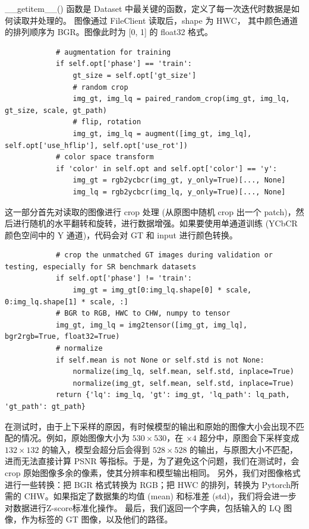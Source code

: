 \documentclass[../main.tex]{subfiles}
\begin{document}
    \_\_getitem\_\_() 函数是 Dataset 中最关键的函数，定义了每一次迭代时数据是如何读取并处理的。 图像通过 FileClient 读取后，shape 为 HWC， 其中颜色通道的排列顺序为 BGR。图像此时为 [0, 1] 的 float32 格式。
    \begin{verbatim}
            # augmentation for training
            if self.opt['phase'] == 'train':
                gt_size = self.opt['gt_size']
                # random crop
                img_gt, img_lq = paired_random_crop(img_gt, img_lq, gt_size, scale, gt_path)
                # flip, rotation
                img_gt, img_lq = augment([img_gt, img_lq], self.opt['use_hflip'], self.opt['use_rot'])
            # color space transform
            if 'color' in self.opt and self.opt['color'] == 'y':
                img_gt = rgb2ycbcr(img_gt, y_only=True)[..., None]
                img_lq = rgb2ycbcr(img_lq, y_only=True)[..., None]
    \end{verbatim}
    这一部分首先对读取的图像进行 crop 处理 (从原图中随机 crop 出一个 patch)，然后进行随机的水平翻转和旋转，进行数据增强。如果要使用单通道训练 (YCbCR 颜色空间中的 Y 通道)，代码会对 GT 和 input 进行颜色转换。
    \begin{verbatim}
            # crop the unmatched GT images during validation or testing, especially for SR benchmark datasets
            if self.opt['phase'] != 'train':
                img_gt = img_gt[0:img_lq.shape[0] * scale, 0:img_lq.shape[1] * scale, :]
            # BGR to RGB, HWC to CHW, numpy to tensor
            img_gt, img_lq = img2tensor([img_gt, img_lq], bgr2rgb=True, float32=True)
            # normalize
            if self.mean is not None or self.std is not None:
                normalize(img_lq, self.mean, self.std, inplace=True)
                normalize(img_gt, self.mean, self.std, inplace=True)
            return {'lq': img_lq, 'gt': img_gt, 'lq_path': lq_path, 'gt_path': gt_path}
    \end{verbatim}
    在测试时，由于上下采样的原因，有时候模型的输出和原始的图像大小会出现不匹配的情况。例如，原始图像大小为 $530 \times 530$，在 $\times 4$  超分中，原图会下采样变成 $132 \times 132$ 的输入，模型会超分后会得到 $528 \times 528$ 的输出，与原图大小不匹配，进而无法直接计算 PSNR 等指标。于是，为了避免这个问题，我们在测试时，会 crop 原始图像多余的像素，使其分辨率和模型输出相同。
    另外，我们对图像格式进行一些转换：把 BGR 格式转换为 RGB；把 HWC 的排列，转换为 Pytorch所需的 CHW。如果指定了数据集的均值 (mean) 和标准差 (std)，我们将会进一步对数据进行Z-score标准化操作。
    最后，我们返回一个字典，包括输入的 LQ 图像，作为标签的 GT 图像，以及他们的路径。
    
\end{document}
